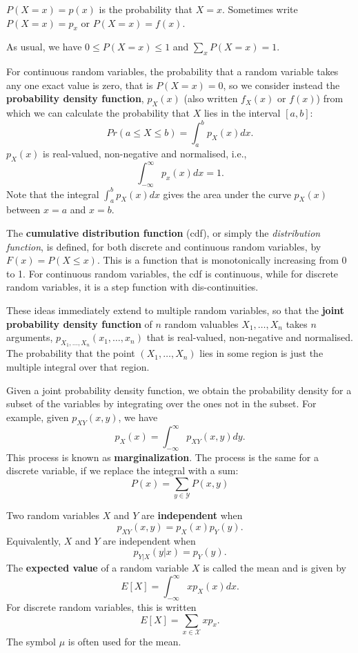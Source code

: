 \documentclass[11pt]{article}
\begin{document}
$P(X=x)  = p(x)$  is the probability that $X = x$. Sometimes write $P(X = x) = p_x$ or  $P(X = x) = f(x)$.
 
As usual, we have $0 \leq P(X=x) \leq 1$ and $\sum_x P(X = x) = 1$.
 
For continuous random variables, the probability that a random variable takes any one exact value is zero, that is $P(X = x) = 0$, so we consider instead the {\bf probability density function}, $p_X(x)$ (also written $f_X(x)$ or $f(x)$) from which we can calculate the probability that $X$ lies in the interval $[a,b]$: 
\[Pr(a \leq X \leq b) = \int_a^b p_X(x) dx.\]
$p_X(x)$ is real-valued, non-negative and normalised, i.e.,  \[ \int_{-\infty}^{\infty} p_x(x) dx = 1.\]
Note that the integral $\int_a^b p_X(x) dx$ gives the area under the curve $ p_X(x)$ between $x = a$ and $x = b$.

The {\bf cumulative distribution function} (cdf), or simply the {\em distribution function}, is defined, for both discrete and continuous random variables, by $F(x) = P(X \leq x)$.  This is a function that is monotonically increasing from 0 to 1.  For continuous random variables, the cdf is continuous, while for discrete random variables, it is a step function with dis-continuities.


These ideas immediately extend to multiple random variables, so that the {\bf joint probability density function} of $n$ random valuables $X_1,\ldots,X_n$ takes $n$ arguments, $p_{X_1,\ldots,X_n}(x_1,\ldots,x_n) $ that is real-valued, non-negative and normalised. The probability that the point $(X_1,\ldots,X_n)$ lies in some region is just the multiple integral over that region.

Given a joint probability density function, we obtain the probability density for a subset of the variables by integrating over the ones not in the subset.  For example, given $p_{XY}(x,y)$, we have \[ p_X(x) = \int_{-\infty}^{\infty} p_{XY}(x,y) dy.\]  This process is known as {\bf marginalization}.   The process is the same for a discrete variable, if we replace the integral with a sum:
\[ P(x) = \sum_{y \in \mathcal Y} P(x,y) \]



Two random variables $X$ and $Y$ are {\bf independent} when \[ p_{XY}(x,y) = p_X(x) p_Y(y).\]  Equivalently,  $X$ and $Y$ are independent when  \[p_{Y|X}(y|x) = p_Y(y).\]
The {\bf expected value} of a random variable $X$ is called the mean and is given by \[ E[X] = \int_{-\infty}^{\infty} x p_X(x) dx. \] For discrete random variables, this is written \[E[X] = \sum_{x \in {\mathcal X}} x p_x.\]  The symbol $\mu$ is often used for the mean.
\end{document}
